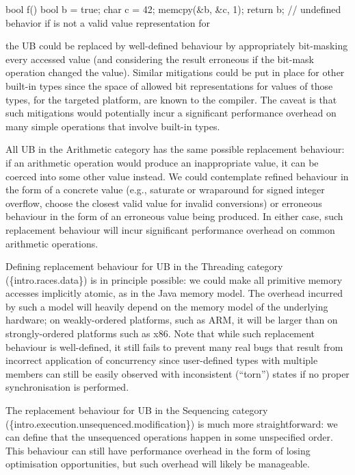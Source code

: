 {\begin{codeblock}
bool f() {
  bool b = true;
  char c = 42;
  memcpy(&b, &c, 1);
  return b;         // undefined behavior if  is not a valid value representation for 
}
\end{codeblock}

the UB could be replaced by well-defined behaviour by appropriately bit-masking every accessed  value (and considering the result erroneous if the bit-mask operation changed the value). Similar mitigations could be put in place for other built-in types since the space of allowed bit representations for values of those types, for the targeted platform, are known to the compiler. The caveat is that such mitigations would potentially incur a significant performance overhead on many simple operations that involve built-in types.

All UB in the Arithmetic category has the same possible replacement behaviour: if an arithmetic operation would produce an inappropriate value, it can be coerced into some other value instead. We could contemplate refined behaviour in the form of a concrete value (e.g., saturate or wraparound for signed integer overflow, choose the closest valid value for invalid conversions) or erroneous behaviour in the form of an erroneous value being produced. In either case, such replacement behaviour will incur significant performance overhead on common arithmetic operations.

Defining replacement behaviour for UB in the Threading category (\{intro.races.data\}) is in principle possible: we could make all primitive memory accesses implicitly atomic, as in the Java memory model. The overhead incurred by such a model will heavily depend on the memory model of the underlying hardware; on weakly-ordered platforms, such as ARM,
it will be larger than on strongly-ordered platforms such as x86. Note that while such replacement behaviour is well-defined, it still fails to prevent many real bugs that result from incorrect application of concurrency since user-defined types with multiple members can still be easily observed with inconsistent (``torn'') states if no proper synchronisation is performed.

The replacement behaviour for UB in the Sequencing category (\{intro.execution.unsequenced.modifica\-tion\}) is much more straightforward: we can define that the unsequenced operations happen in some unspecified order. This behaviour can still have performance overhead in the form of losing  optimisation opportunities, but such overhead will likely be manageable. 

}
